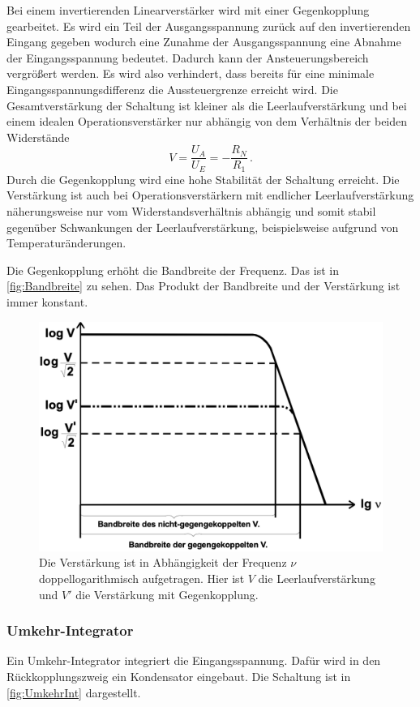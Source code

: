 Bei einem invertierenden Linearverstärker wird mit einer Gegenkopplung gearbeitet. Es wird ein Teil der Ausgangsspannung zurück auf den invertierenden Eingang gegeben wodurch eine Zunahme der Ausgangsspannung eine Abnahme der Eingangsspannung bedeutet. Dadurch kann der Ansteuerungsbereich vergrößert werden. Es wird also verhindert, dass bereits für eine minimale Eingangsspannungsdifferenz die Aussteuergrenze erreicht wird. Die Gesamtverstärkung der Schaltung ist kleiner als die Leerlaufverstärkung und bei einem idealen Operationsverstärker nur abhängig von dem Verhältnis der beiden Widerstände
\begin{equation*}
    V = \frac{U_A}{U_E} = - \frac{R_N}{R_1} \, .
\end{equation*}
Durch die Gegenkopplung wird eine hohe Stabilität der Schaltung erreicht. Die Verstärkung ist auch bei Operationsverstärkern mit endlicher Leerlaufverstärkung näherungsweise nur vom Widerstandsverhältnis abhängig und somit stabil gegenüber Schwankungen der Leerlaufverstärkung, beispielsweise aufgrund von Temperaturänderungen.

Die Gegenkopplung erhöht die Bandbreite der Frequenz. Das ist in \autoref{fig:Bandbreite} zu sehen. Das Produkt der Bandbreite und der Verstärkung ist immer konstant.

\begin{figure}
    \centering
    \includegraphics[width=0.7\linewidth]{./figures/Bandbreite.png}
    \caption{Die Verstärkung ist in Abhängigkeit der Frequenz $\nu$ doppellogarithmisch aufgetragen. Hier ist $V$ die Leerlaufverstärkung und $V'$ die Verstärkung mit Gegenkopplung.} %
\end{figure}


\subsubsection{Umkehr-Integrator}
Ein Umkehr-Integrator integriert die Eingangsspannung.
Dafür wird in den Rückkopplungszweig ein Kondensator eingebaut. Die Schaltung ist in \autoref{fig:UmkehrInt} dargestellt.

